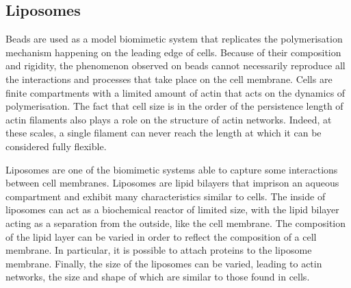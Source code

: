 \documentclass[A4paperpaper,11pt,english]{sphinxmanual}
\begin{document}
\subsection{Liposomes}
\label{parts/part1:liposomes}
Beads are used as a model biomimetic system that replicates the polymerisation mechanism
happening on the leading edge of cells. Because of their composition and
rigidity, the phenomenon observed on beads cannot necessarily reproduce all the interactions and
processes that take place on the cell membrane. Cells are finite compartments with a
limited amount of actin that acts on the dynamics of polymerisation.  The fact
that cell size is in the order of the persistence length of actin filaments
also plays a role on the structure of actin networks. Indeed, at these scales, a
single filament can never reach the length at which it can be considered fully
flexible.

Liposomes are one of the biomimetic systems able to capture some
interactions between cell membranes. Liposomes are lipid bilayers that imprison
an aqueous compartment and exhibit many characteristics similar to cells.
The inside of liposomes can act as a biochemical reactor of limited size, with
the lipid bilayer acting as a separation from the outside, like the cell
membrane. The composition of the lipid layer can be varied in order to reflect
the composition of a cell membrane. In particular, it is possible to attach
proteins to the liposome membrane. Finally, the size of the liposomes can be
varied, leading to actin networks, the size and shape of which are similar to those found in
cells.
\end{document}
